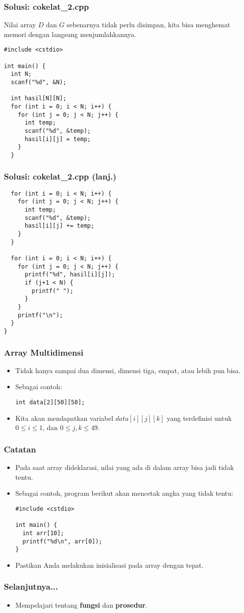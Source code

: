 \begin{frame}[fragile]
\frametitle{Solusi: cokelat\_2.cpp}
Nilai array $D$ dan $G$ sebenarnya tidak perlu disimpan, kita bisa menghemat memori dengan langsung menjumlahkannya.
\begin{lstlisting}
#include <cstdio>

int main() {
  int N;
  scanf("%d", &N);

  int hasil[N][N];
  for (int i = 0; i < N; i++) {
    for (int j = 0; j < N; j++) {
      int temp;
      scanf("%d", &temp);
      hasil[i][j] = temp;
    }
  }
\end{lstlisting}
\end{frame}

\begin{frame}[fragile]
\frametitle{Solusi: cokelat\_2.cpp (lanj.)}
\begin{lstlisting}
  for (int i = 0; i < N; i++) {
    for (int j = 0; j < N; j++) {
      int temp;
      scanf("%d", &temp);
      hasil[i][j] += temp;
    }
  }

  for (int i = 0; i < N; i++) {
    for (int j = 0; j < N; j++) {
      printf("%d", hasil[i][j]);
      if (j+1 < N) {
        printf(" ");
      }
    }
    printf("\n");
  }
}

\end{lstlisting}
\end{frame}

\begin{frame}[fragile]
\frametitle{Array Multidimensi}
\begin{itemize}
  \item Tidak hanya sampai dua dimensi, dimensi tiga, empat, atau lebih pun bisa.
  \item Sebagai contoh:
\begin{lstlisting}
int data[2][50][50];
\end{lstlisting}
  \item Kita akan mendapatkan variabel $data[i][j][k]$ yang terdefinisi untuk $0 \le i \le 1$, dan $0 \le j, k \le 49$.
\end{itemize}
\end{frame}

\begin{frame}[fragile]
\frametitle{Catatan}
\begin{itemize}
  \item Pada saat array dideklarasi, nilai yang ada di dalam array bisa jadi tidak tentu.
  \item Sebagai contoh, program berikut akan mencetak angka yang tidak tentu:
\begin{lstlisting}
#include <cstdio>

int main() {
  int arr[10];
  printf("%d\n", arr[0]);
}
\end{lstlisting}
  \item Pastikan Anda melakukan inisialisasi pada array dengan tepat.
\end{itemize}
\end{frame}


\begin{frame}
\frametitle{Selanjutnya...}
\begin{itemize}
  \item Mempelajari tentang \textbf{fungsi} dan \textbf{prosedur}.
\end{itemize}
\end{frame}



